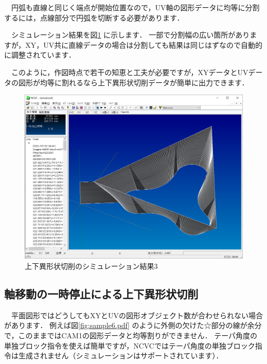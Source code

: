 　円弧も直線と同じく端点が開始位置なので，UV軸の図形データに均等に分割するには，点線部分で円弧を切断する必要があります．

　シミュレーション結果を図\ref{fig:simu4.png} に示します．
一部で分割幅の広い箇所がありますが，XY，UV共に直線データの場合は分割しても結果は同じはずなので自動的に調整されています．

　このように，作図時点で若干の知恵と工夫が必要ですが，XYデータとUVデータの図形が均等に割れるなら上下異形状切削データが簡単に出力できます．

\begin{figure}[H]
\centering
\includegraphics[scale=0.5]{No2/fig/simu4.png}
\caption{上下異形状切削のシミュレーション結果3}
\label{fig:simu4.png}
\end{figure}

\subsection{軸移動の一時停止による上下異形状切削}
　平面図形ではどうしてもXYとUVの図形オブジェクト数が合わせられない場合があります．
例えば図\ref{fig:sample6.pdf} のように外側の欠けた☆部分の線が余分で，このままではCAM1の図形データと均等割りができません．
テーパ角度の単独ブロック指令を使えば簡単ですが，NCVCではテーパ角度の単独ブロック指令は生成されません（シミュレーションはサポートされています）．

